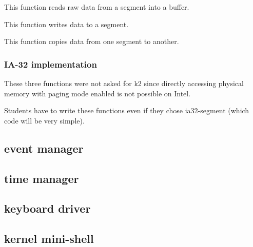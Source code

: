 This function reads raw data from a segment into a buffer.


This function writes data to a segment.


This function copies data from one segment to another.

\subsubsection{IA-32 implementation}

These three functions  were not asked for k2  since directly accessing
physical memory with paging mode enabled is not possible on Intel.

Students have to write these functions even if they chose ia32-segment
(which code will be very simple).

\subsection{event manager}

\subsection{time manager}

\subsection{keyboard driver}

\subsection{kernel mini-shell}

